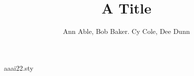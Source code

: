 \begin{filecontents*}[overwrite]{aaai22.sty}
\def\maketitle{\par\begingroup\def\thefootnote{\fnsymbol{footnote}}\twocolumn[\@maketitle]\@thanks\endgroup
  \setcounter{footnote}{0}\let\maketitle\relax\let\@maketitle\relax
  \gdef\@thanks{}\gdef\@author{}\gdef\@title{}\let\thanks\relax}
\def\@maketitle{\newcounter{eqfn}\setcounter{eqfn}{0}%
  \vbox{\let\footnote\thanks\relax\setcounter{footnote}{0}%
    \def\equalcontrib{\ifnum\value{eqfn}=0 \footnote{These authors contributed equally.}%
      \setcounter{eqfn}{\value{footnote}}\else\footnotemark[\value{eqfn}]\fi}%
    \hsize\textwidth\centering{\LARGE\bf\@title\par}\vskip 1em{\Large\bf\@author\par}}}
\end{filecontents*}
\documentclass{article}
\usepackage{aaai22}
\title{A Title}
\author{Ann Able\equalcontrib, Bob Baker\equalcontrib. Cy Cole\equalcontrib, Dee Dunn}

\maketitle
Body.

